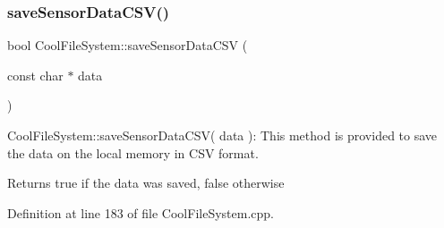 \subsubsection{\texorpdfstring{save\+Sensor\+Data\+C\+S\+V()}{saveSensorDataCSV()}}
{\footnotesize\ttfamily bool Cool\+File\+System\+::save\+Sensor\+Data\+C\+SV (\begin{DoxyParamCaption}\item[{const char $\ast$}]{data }\end{DoxyParamCaption})}

Cool\+File\+System\+::save\+Sensor\+Data\+C\+S\+V( data )\+: This method is provided to save the data on the local memory in C\+SV format.

\begin{DoxyReturn}{Returns}
true if the data was saved, false otherwise 
\end{DoxyReturn}


Definition at line 183 of file Cool\+File\+System.\+cpp.


